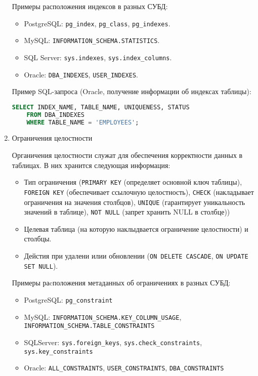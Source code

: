 \begin{enumerate}
    Примеры расположения индексов в разных СУБД:
    \begin{itemize}
        \item PostgreSQL: \texttt{pg\_index}, \texttt{pg\_class}, \texttt{pg\_indexes}.
        \item MySQL: \texttt{INFORMATION\_SCHEMA.STATISTICS}.
        \item SQL Server: \texttt{sys.indexes}, \texttt{sys.index\_columns}.
        \item Oracle: \texttt{DBA\_INDEXES}, \texttt{USER\_INDEXES}.
    \end{itemize}

    Пример SQL-запроса (Oracle, получение информации об индексах таблицы):
    \begin{lstlisting}[language=SQL]
    SELECT INDEX_NAME, TABLE_NAME, UNIQUENESS, STATUS 
    FROM DBA_INDEXES 
    WHERE TABLE_NAME = 'EMPLOYEES';
    \end{lstlisting}

    \item Ограничения целостности \autocites[§51.13]{PostgreSQLdocc51}[§28.3.42]{Mysqldoc1}{MicrosoftLearnSQLserverTab}

    Органичения целостности служат для обеспечения корректности данных в таблицах. В них хранится следующая информация:
    \begin{itemize}
        \item Тип ограничения (\texttt{PRIMARY KEY} (определяет основной ключ таблицы), \texttt{FOREIGN KEY} (обеспечивает ссылочную целостность), \texttt{CHECK} (накладывает ограничения на значения столбцов), \texttt{UNIQUE} (гарантирует уникальность значений в таблице), \texttt{NOT NULL} (запрет хранить NULL в столбце))
        \item Целевая таблица (на которую наклыдвается ограничение целостности) и столбцы.
        \item Дейстия при удалени илии обновлении (\texttt{ON DELETE CASCADE}, \texttt{ON UPDATE SET NULL}).
    \end{itemize}

    Примеры раcположения метаданных об ограничениях в разных СУБД:
    \begin{itemize}
        \item PostgreSQL: \texttt{pg\_constraint}
        \item MySQL: \texttt{INFORMATION\_SCHEMA.KEY\_COLUMN\_USAGE}, \texttt{INFORMATION\_SCHEMA.TABLE\_CONSTRAINTS}
        \item SQLServer: \texttt{sys.foreign\_keys}, \texttt{sys.check\_constraints}, \texttt{sys.key\_constraints}
        \item Oracle: \texttt{ALL\_CONSTRAINTS}, \texttt{USER\_CONSTRAINTS}, \texttt{DBA\_CONSTRAINTS}
    \end{itemize}


\end{enumerate}

